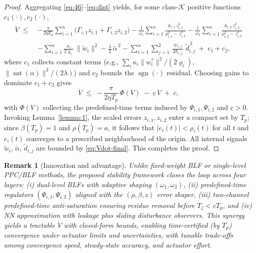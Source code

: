 \documentclass[pdflatex,sn-mathphys-num]{sn-jnl}%
\theoremstyle{thmstyleone}%
\theoremstyle{thmstyletwo}%
\newtheorem{remark}{Remark}%
\theoremstyle{thmstylethree}%
\begin{document}
\begin{proof}
Aggregating \eqref{eq:46}–\eqref{eq:dist} yields, for some class-$\mathcal{K}$ positive functions $c_1(\cdot),c_2(\cdot)$,
\begin{equation}\label{eq:Vdot-final}
\begin{aligned}
  \dot V \;\le\;
  &- \frac{\pi}{2\eta T_p}\sum_{i=1}^{n}\!\big(\Gamma_{i,1}z_{i,1}+\Gamma_{i,2}z_{i,2}\big)
   - \frac{1}{\omega_{1}}\sum_{i=1}^{n}\frac{k_{i,1}\, z_{i,1}^2}{\rho_{i,1}^2 - z_{i,1}^2}
   - \frac{1}{\omega_{2}}\sum_{i=1}^{n}\frac{k_{i,2}\, z_{i,2}^2}{\rho_{i,2}^2 - z_{i,2}^2}  \\
  &- \sum_{i=1}^{n}\frac{\kappa_i}{2\varrho_i}\,\|\tilde w_i\|^2
   - \frac{\lambda}{2}\,\tilde\alpha^{\,2}
   - \sum_{i=1}^{n}\sum_{j=1}^{2}\frac{\varpi_{i,j}}{2\hbar_{i,j}}\,\tilde d_{i,j}^{\,2}
   \;+\; c_1 + c_2,
\end{aligned}
\end{equation}
where $c_1$ collects constant terms (e.g., $\sum_i \kappa_i\|w_i^*\|^2/(2\varrho_i)$, $\|\dot{\operatorname{sat}}(\alpha)\|^2/(2\lambda)$) and $c_2$ bounds the $\operatorname{sgn}(\cdot)$ residual. Choosing gains to dominate $c_1+c_2$ gives
\[
 \dot V \;\le\; -\frac{\pi}{2\eta T_p}\,\Phi(V)\;-\;\underline{c}\,V\;+\;\overline{c},
\]
with $\Phi(V)$ collecting the predefined-time terms induced by $\Psi_{i,1},\Psi_{i,2}$ and $\underline{c}>0$. Invoking Lemma~\ref{lemma:1}, the scaled errors $z_{i,1},z_{i,2}$ enter a compact set by $T_p$; since $\beta(T_p)=1$ and $\rho(T_p)=a$, it follows that $|e_i(t)|<\rho_i(t)$ for all $t$ and $e_i(t)$ converges to a prescribed neighborhood of the origin. All internal signals $\tilde w_i$, $\tilde\alpha$, $\tilde d_{i,j}$ are bounded by \eqref{eq:Vdot-final}. This completes the proof.
\end{proof}

\begin{remark}[Innovation and advantage]
Unlike fixed-weight BLF or single-level PPC/BLF methods, the proposed stability framework \emph{closes the loop} across four layers: (i) dual-level BLFs with \emph{adaptive shaping} $(\omega_1,\omega_2)$, (ii) \emph{predefined-time} regulators $(\Psi_{i,1},\Psi_{i,2})$ aligned with the $(\rho,\beta,z)$ error shaper, (iii) two-channel \emph{predefined-time anti-saturation} ensuring residue removal before $T_\zeta<cT_p$, and (iv) NN approximation with \emph{leakage} plus sliding disturbance observers. This synergy yields a tractable $\dot V$ with closed-form bounds, enabling \emph{time-certified} (by $T_p$) convergence under actuator limits and uncertainties, with tunable trade-offs among convergence speed, steady-state accuracy, and actuator effort.
\end{remark}
\end{document}
